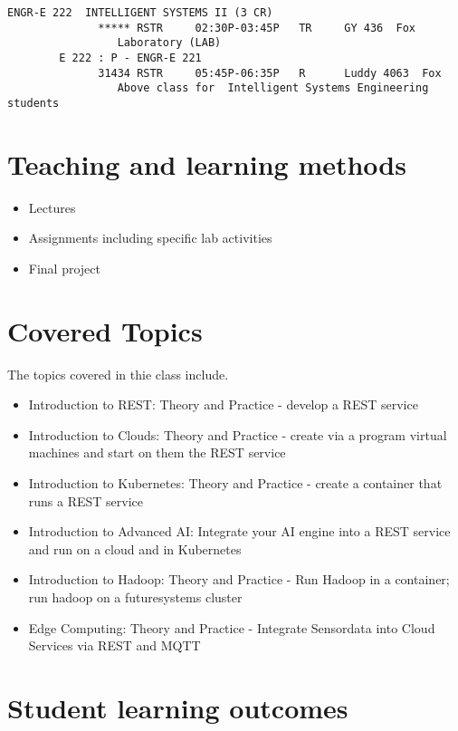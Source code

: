 \begin{verbatim}
ENGR-E 222  INTELLIGENT SYSTEMS II (3 CR)
              ***** RSTR     02:30P-03:45P   TR     GY 436  Fox
                 Laboratory (LAB)
        E 222 : P - ENGR-E 221
              31434 RSTR     05:45P-06:35P   R      Luddy 4063  Fox
                 Above class for  Intelligent Systems Engineering students

\end{verbatim}        


\section{Teaching and learning methods}


\begin{itemize}
\item Lectures
\item Assignments including specific lab activities
\item Final project 
\end{itemize}

\section{Covered Topics}

The topics covered in thie class include.

\begin{itemize}
\item Introduction to REST: Theory and Practice - develop a REST service
\item Introduction to Clouds: Theory and Practice - create via a
  program virtual machines and start on them the REST service
\item Introduction to Kubernetes: Theory and Practice - create a
  container that runs a REST service
\item Introduction to Advanced AI: Integrate your AI engine into a
  REST service and run on a cloud and in Kubernetes 
\item Introduction to Hadoop: Theory and Practice - Run Hadoop in a
  container; run hadoop on a futuresystems cluster
\item Edge Computing: Theory and Practice - Integrate Sensordata into
  Cloud Services via REST and MQTT
\end{itemize}


\section{Student learning outcomes}

